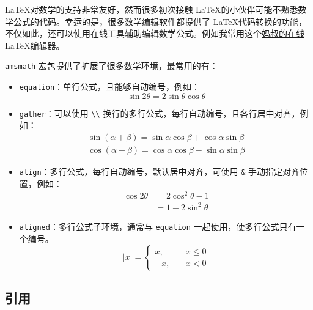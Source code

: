 \LaTeX 对数学的支持非常友好，然而很多初次接触 \LaTeX 的小伙伴可能不熟悉数学公式的代码。幸运的是，很多数学编辑软件都提供了 \LaTeX 代码转换的功能，不仅如此，还可以使用在线工具辅助编辑数学公式。例如我常用这个\href{https://www.latexlive.com}{妈叔的在线 \LaTeX 编辑器}。


\verb|amsmath| 宏包提供了扩展了很多数学环境，最常用的有：

\begin{itemize}
    \item \verb|equation|：单行公式，且能够自动编号，例如：
        \begin{equation}
            \sin 2 \theta = 2\sin\theta\cos\theta \label{eq:sin2theta}
        \end{equation}

   \item \verb|gather|：可以使用 \verb|\\| 换行的多行公式，每行自动编号，且各行居中对齐，例如：
       \begin{gather}
           \sin \left( \alpha + \beta \right) = \sin\alpha\cos\beta + \cos\alpha\sin\beta \label{eq:sinab} \\
           \cos \left( \alpha + \beta \right) = \cos\alpha\cos\beta - \sin\alpha\sin\beta \label{eq:cosab}
       \end{gather}

    \item \verb|align|：多行公式，每行自动编号，默认居中对齐，可使用 \verb|&| 手动指定对齐位置，例如：
        \begin{align}
            \cos2\theta &= 2\cos^2\theta-1 \label{cos2theta1}\\
                        &= 1-2\sin^2\theta \label{cos2theta2}
        \end{align}

    \item \verb|aligned|：多行公式子环境，通常与 \verb|equation| 一起使用，使多行公式只有一个编号。
        \begin{equation}
            \left\lvert x \right\rvert =
            \left\{
            \begin{aligned}
                x, &\quad x \le 0 \\
                -x, &\quad x < 0
            \end{aligned}
            \right.  \label{eq:abs}
        \end{equation}
\end{itemize}


\subsection{引用} \label{subsec:citations}

